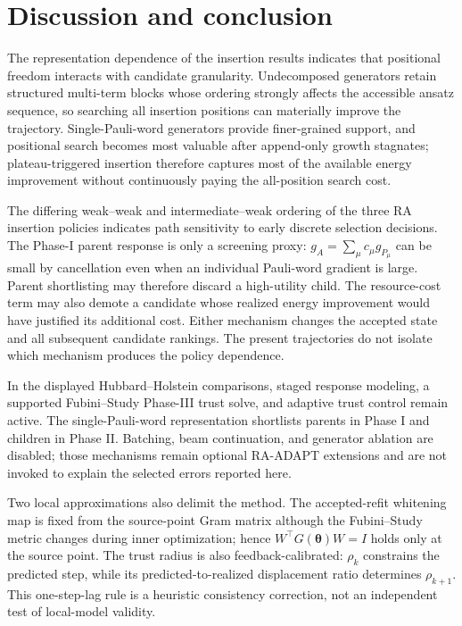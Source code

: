 \documentclass[
  reprint,
  amsmath,
  amssymb,
  aps,
  pra,
  nofootinbib,
  superscriptaddress,
  floatfix
]{revtex4-2}
\begin{document}
\section{Discussion and conclusion}
\label{sec:discussion}
\label{sec:conclusion}

The representation dependence of the insertion results indicates that
positional freedom interacts with candidate granularity. Undecomposed
generators retain structured multi-term blocks whose ordering strongly affects
the accessible ansatz sequence, so searching all insertion positions can
materially improve the trajectory. Single-Pauli-word generators provide
finer-grained support, and positional search becomes most valuable after
append-only growth stagnates; plateau-triggered insertion therefore captures
most of the available energy improvement without continuously paying the
all-position search cost.

The differing weak--weak and intermediate--weak ordering of the three RA
insertion policies indicates path sensitivity to early discrete selection
decisions. The Phase-I parent response is only a screening proxy:
\(g_A=\sum_\mu c_\mu g_{P_\mu}\) can be small by cancellation even when an
individual Pauli-word gradient is large. Parent shortlisting may therefore
discard a high-utility child. The resource-cost term may also demote a candidate whose
realized energy improvement would have justified its additional cost. Either
mechanism changes the accepted state and all subsequent candidate rankings.
The present trajectories do not isolate which mechanism produces the policy
dependence.

In the displayed Hubbard--Holstein comparisons, staged response modeling, a supported Fubini--Study Phase-III trust solve, and adaptive trust control remain active. The single-Pauli-word representation shortlists parents in Phase I and children in Phase II. Batching, beam continuation, and generator ablation are disabled; those mechanisms remain optional RA-ADAPT extensions and are not invoked to explain the selected errors reported here.

Two local approximations also delimit the method. The accepted-refit whitening
map is fixed from the source-point Gram matrix although the Fubini--Study metric
changes during inner optimization; hence
\(W^\top G(\boldsymbol\theta)W=I\) holds only at the source point. The trust
radius is also feedback-calibrated: \(\rho_k\) constrains the predicted step,
while its predicted-to-realized displacement ratio determines \(\rho_{k+1}\).
This one-step-lag rule is a heuristic consistency correction, not an
independent test of local-model validity.
\end{document}
